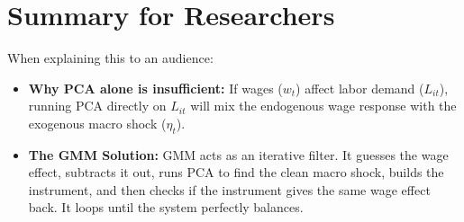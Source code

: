 \documentclass[11pt]{article}
\begin{document}
\section{Summary for Researchers}
When explaining this to an audience:
\begin{itemize}
    \item \textbf{Why PCA alone is insufficient:} If wages ($w_t$) affect labor demand ($L_{it}$), running PCA directly on $L_{it}$ will mix the endogenous wage response with the exogenous macro shock ($\eta_t$).
    \item \textbf{The GMM Solution:} GMM acts as an iterative filter. It guesses the wage effect, subtracts it out, runs PCA to find the clean macro shock, builds the instrument, and then checks if the instrument gives the same wage effect back. It loops until the system perfectly balances.
\end{itemize}
\end{document}
